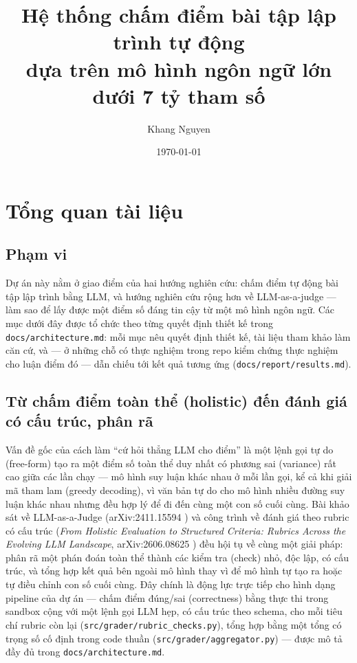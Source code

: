\documentclass[a4paper,12pt]{report}
\title{Hệ thống chấm điểm bài tập lập trình tự động\\ dựa trên mô hình ngôn ngữ lớn dưới 7 tỷ tham số}
\author{Khang Nguyen}
\date{\today}
\begin{document}
\maketitle
\tableofcontents

\chapter{Tổng quan tài liệu}
\label{ch:lit-review}

\section{Phạm vi}

Dự án này nằm ở giao điểm của hai hướng nghiên cứu: chấm điểm tự động bài
tập lập trình bằng LLM, và hướng nghiên cứu rộng hơn về LLM-as-a-judge —
làm sao để lấy được một điểm số đáng tin cậy từ một mô hình ngôn ngữ. Các
mục dưới đây được tổ chức theo từng quyết định thiết kế trong
\texttt{docs/architecture.md}: mỗi mục nêu quyết định thiết kế, tài liệu
tham khảo làm căn cứ, và — ở những chỗ có thực nghiệm trong repo kiểm chứng
thực nghiệm cho luận điểm đó — dẫn chiếu tới kết quả tương ứng
(\texttt{docs/report/results.md}).

\section{Từ chấm điểm toàn thể (holistic) đến đánh giá có cấu trúc, phân rã}
\label{sec:rubric-decomposition-lit}

Vấn đề gốc của cách làm ``cứ hỏi thẳng LLM cho điểm'' là một lệnh gọi tự do
(free-form) tạo ra một điểm số toàn thể duy nhất có phương sai (variance)
rất cao giữa các lần chạy — mô hình suy luận khác nhau ở mỗi lần gọi, kể cả
khi giải mã tham lam (greedy decoding), vì văn bản tự do cho mô hình nhiều
đường suy luận khác nhau nhưng đều hợp lý để đi đến cùng một con số cuối
cùng. Bài khảo sát về LLM-as-a-Judge (arXiv:2411.15594
\cite{survey_llm_judge}) và công trình về đánh giá theo rubric có cấu trúc
(\textit{From Holistic Evaluation to Structured Criteria: Rubrics Across
the Evolving LLM Landscape}, arXiv:2606.08625
\cite{rubric_decomposition}) đều hội tụ về cùng một giải pháp: phân rã một
phán đoán toàn thể thành các kiểm tra (check) nhỏ, độc lập, có cấu trúc, và
tổng hợp kết quả bên ngoài mô hình thay vì để mô hình tự tạo ra hoặc tự
điều chỉnh con số cuối cùng. Đây chính là động lực trực tiếp cho hình dạng
pipeline của dự án — chấm điểm đúng/sai (correctness) bằng thực thi trong
sandbox cộng với một lệnh gọi LLM hẹp, có cấu trúc theo schema, cho mỗi
tiêu chí rubric còn lại (\texttt{src/grader/rubric\_checks.py}), tổng hợp
bằng một tổng có trọng số cố định trong code thuần
(\texttt{src/grader/aggregator.py}) — được mô tả đầy đủ trong
\texttt{docs/architecture.md}.
\end{document}
